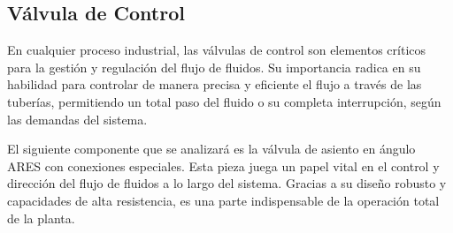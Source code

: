

\subsection{Válvula de Control} \label{sec:valvula_OnOff}

En cualquier proceso industrial, las válvulas de control son elementos críticos para la gestión y regulación del flujo de fluidos.
Su importancia radica en su habilidad para controlar de manera precisa y eficiente el flujo a través de las tuberías, permitiendo un
total paso del fluido o su completa interrupción, según las demandas del sistema.

El siguiente componente que se analizará es la válvula de asiento en ángulo ARES con conexiones especiales. Esta pieza juega un papel vital en el control y dirección del flujo de fluidos a lo largo del sistema. Gracias a su diseño robusto y capacidades de alta resistencia, es una parte indispensable de la operación total de la planta.


